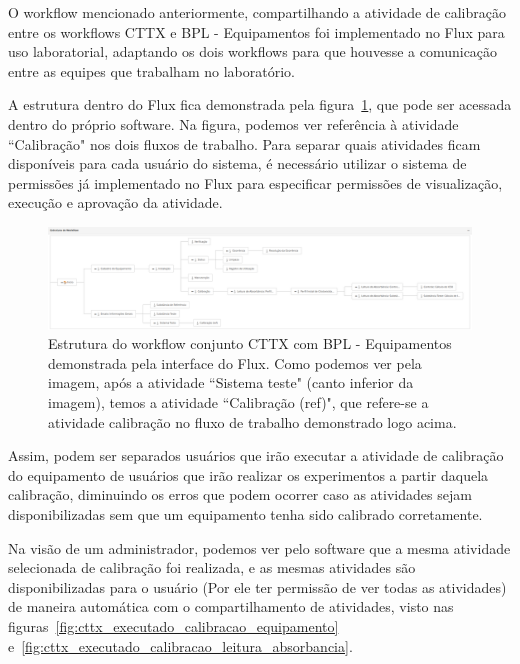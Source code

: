 O workflow mencionado anteriormente, compartilhando a atividade de calibração entre os workflows CTTX e BPL - Equipamentos foi implementado no Flux para uso laboratorial, adaptando os dois workflows para que houvesse a comunicação entre as equipes que trabalham no laboratório.

A estrutura dentro do Flux fica demonstrada pela figura~\ref{fig:cttx_bpl_flux}, que pode ser acessada dentro do próprio software. Na figura, podemos ver referência à atividade ``Calibração" nos dois fluxos de trabalho. Para separar quais atividades ficam disponíveis para cada usuário do sistema, é necessário utilizar o sistema de permissões já implementado no Flux para especificar permissões de visualização, execução e aprovação da atividade.

\begin{figure}
    \centering
    \includegraphics[width=1\textwidth]{imgs/CTTX-EQP/estrutura_cttx_eqp_flux.png}
    \caption{Estrutura do workflow conjunto CTTX com BPL - Equipamentos demonstrada pela interface do Flux. Como podemos ver pela imagem, após a atividade ``Sistema teste" (canto inferior da imagem), temos a atividade ``Calibração (ref)", que refere-se a atividade calibração no fluxo de trabalho demonstrado logo acima.}
    \label{fig:cttx_bpl_flux}
\end{figure}

Assim, podem ser separados usuários que irão executar a atividade de calibração do equipamento de usuários que irão realizar os experimentos a partir daquela calibração, diminuindo os erros que podem ocorrer caso as atividades sejam disponibilizadas sem que um equipamento tenha sido calibrado corretamente.

Na visão de um administrador, podemos ver pelo software que a mesma atividade selecionada de calibração foi realizada, e as mesmas atividades são disponibilizadas para o usuário (Por ele ter permissão de ver todas as atividades) de maneira automática com o compartilhamento de atividades, visto nas figuras~\ref{fig:cttx_executado_calibracao_equipamento} e~\ref{fig:cttx_executado_calibracao_leitura_absorbancia}.


